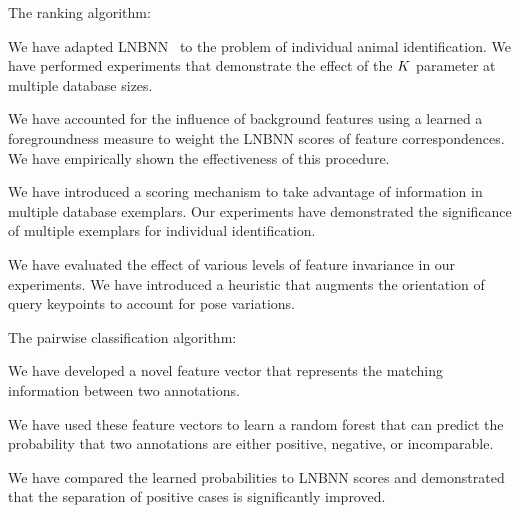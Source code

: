     \begin{enumln}
    \item {The ranking algorithm}:
        \begin{enumln}
        \item We have adapted LNBNN~\cite{mccann_local_2012} to the problem of individual animal identification.
        We have performed experiments that demonstrate the effect of the $K$ parameter at multiple database
          sizes.

        \item We have accounted for the influence of background features using a learned a foregroundness measure
          to weight the LNBNN scores of feature correspondences.
        We have empirically shown the effectiveness of this procedure.

        \item We have introduced a \name{} scoring mechanism to take advantage of information in multiple
          database exemplars.
        Our experiments have demonstrated the significance of multiple exemplars for individual identification.

        \item We have evaluated the effect of various levels of feature invariance in our experiments.
        We have introduced a heuristic that augments the orientation of query keypoints to account for pose
          variations.
        \end{enumln}

    \item {The pairwise classification algorithm}:
        \begin{enumln}

        \item We have developed a novel feature vector that represents the matching information between two
          annotations.

        \item We have used these feature vectors to learn a random forest that can predict the probability that
          two annotations are either positive, negative, or incomparable.

        \item We have compared the learned probabilities to LNBNN scores and demonstrated that the separation of
          positive cases is significantly improved.
        \end{enumln}



\end{enumln}
